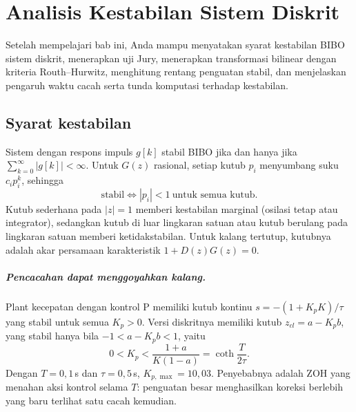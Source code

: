 \chapter{Analisis Kestabilan Sistem Diskrit}
\label{bab:stabil}

\begin{tujuan}
	Setelah mempelajari bab ini, Anda mampu menyatakan syarat kestabilan BIBO sistem diskrit, menerapkan uji Jury, menerapkan transformasi bilinear dengan kriteria Routh--Hurwitz, menghitung rentang penguatan stabil, dan menjelaskan pengaruh waktu cacah serta tunda komputasi terhadap kestabilan.
\end{tujuan}

\section{Syarat kestabilan}
Sistem dengan respons impuls $g[k]$ stabil BIBO jika dan hanya jika $\sum_{k=0}^{\infty}|g[k]| < \infty$. Untuk $G(z)$ rasional, setiap kutub $p_i$ menyumbang suku $c_ip_i^k$, sehingga
\begin{equation}
	\text{stabil} \iff |p_i| < 1 \ \text{untuk semua kutub}.
\end{equation}
Kutub sederhana pada $|z| = 1$ memberi kestabilan marginal (osilasi tetap atau integrator), sedangkan kutub di luar lingkaran satuan atau kutub berulang pada lingkaran satuan memberi ketidakstabilan. Untuk kalang tertutup, kutubnya adalah akar persamaan karakteristik $1 + D(z)G(z) = 0$.

\paragraph{Pencacahan dapat menggoyahkan kalang.} Plant kecepatan dengan kontrol P memiliki kutub kontinu $s = -(1+K_pK)/\tau$ yang stabil untuk semua $K_p > 0$. Versi diskritnya memiliki kutub $z_{cl} = a - K_pb$, yang stabil hanya bila $-1 < a - K_pb < 1$, yaitu
\begin{equation}
	0 < K_p < \frac{1+a}{K(1-a)} = \coth\frac{T}{2\tau}.
\end{equation}
Dengan $T = 0{,}1$\,s dan $\tau = 0{,}5$\,s, $K_{p,\max} = 10{,}03$. Penyebabnya adalah ZOH yang menahan aksi kontrol selama $T$: penguatan besar menghasilkan koreksi berlebih yang baru terlihat satu cacah kemudian.

